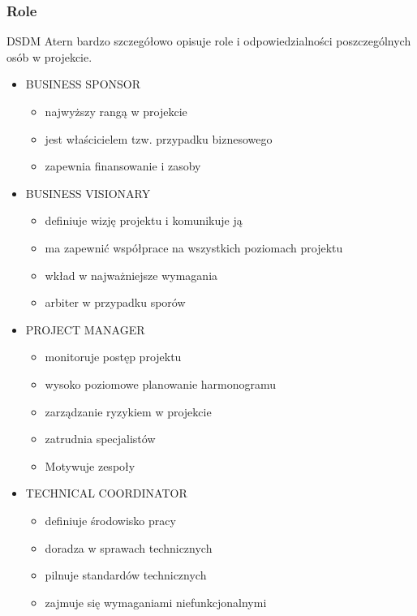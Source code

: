 \documentclass[a4paper]{article}
\begin{document}
\subsubsection{Role}
    DSDM Atern bardzo szczegółowo opisuje role i odpowiedzialności poszczególnych osób w projekcie.

    \begin{itemize}
        \item BUSINESS SPONSOR
        \begin{itemize}
            \item najwyższy rangą w projekcie
            \item jest właścicielem tzw. przypadku biznesowego
            \item zapewnia finansowanie i zasoby
        \end{itemize}
        \item BUSINESS VISIONARY
        \begin{itemize}
            \item definiuje wizję projektu i komunikuje ją
            \item ma zapewnić współprace na wszystkich poziomach projektu
            \item wkład w najważniejsze wymagania
            \item arbiter w przypadku sporów
        \end{itemize}
        \item PROJECT MANAGER
        \begin{itemize}
            \item monitoruje postęp projektu
            \item wysoko poziomowe planowanie harmonogramu
            \item zarządzanie ryzykiem w projekcie
            \item zatrudnia specjalistów
            \item Motywuje zespoły
        \end{itemize}
        \item TECHNICAL COORDINATOR
        \begin{itemize}
            \item definiuje środowisko pracy
            \item doradza w sprawach technicznych
            \item pilnuje standardów technicznych
            \item zajmuje się wymaganiami
niefunkcjonalnymi
        \end{itemize}

\end{itemize}
\end{document}
